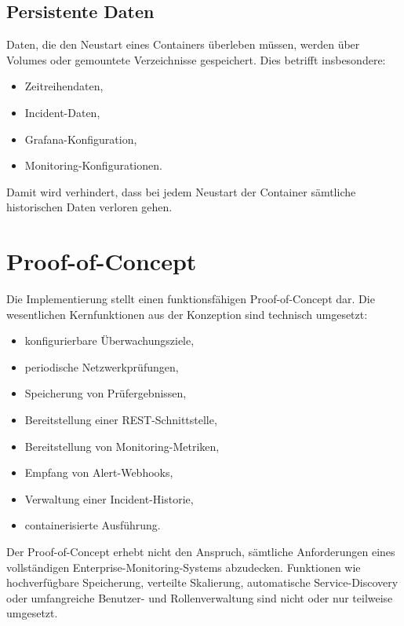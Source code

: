 \subsection{Persistente Daten}
\label{subsec:persistente-daten-container}

Daten, die den Neustart eines Containers überleben müssen, werden über Volumes oder gemountete Verzeichnisse gespeichert. Dies betrifft insbesondere:

\begin{itemize}
    \item Zeitreihendaten,
    \item Incident-Daten,
    \item Grafana-Konfiguration,
    \item Monitoring-Konfigurationen.
\end{itemize}

Damit wird verhindert, dass bei jedem Neustart der Container sämtliche historischen Daten verloren gehen.

\section{Proof-of-Concept}
\label{sec:proof-of-concept}

Die Implementierung stellt einen funktionsfähigen Proof-of-Concept dar. Die wesentlichen Kernfunktionen aus der Konzeption sind technisch umgesetzt:

\begin{itemize}
    \item konfigurierbare Überwachungsziele,
    \item periodische Netzwerkprüfungen,
    \item Speicherung von Prüfergebnissen,
    \item Bereitstellung einer REST-Schnittstelle,
    \item Bereitstellung von Monitoring-Metriken,
    \item Empfang von Alert-Webhooks,
    \item Verwaltung einer Incident-Historie,
    \item containerisierte Ausführung.
\end{itemize}

Der Proof-of-Concept erhebt nicht den Anspruch, sämtliche Anforderungen eines vollständigen Enterprise-Monitoring-Systems abzudecken. Funktionen wie hochverfügbare Speicherung, verteilte Skalierung, automatische Service-Discovery oder umfangreiche Benutzer- und Rollenverwaltung sind nicht oder nur teilweise umgesetzt.

